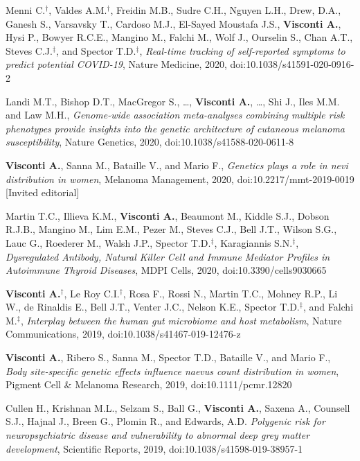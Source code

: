 {\begin{itemize}
		 Menni C.$^{\textbf{$\dag $}}$, Valdes A.M.$^{\textbf{$\dag $}}$, Freidin M.B., Sudre C.H., Nguyen L.H., Drew, D.A., Ganesh S., Varsavsky T., Cardoso M.J., El-Sayed Moustafa J.S., \textbf{Visconti A.}, Hysi P., Bowyer R.C.E., Mangino M., Falchi M., Wolf J., Ourselin S., Chan A.T., Steves C.J.$^{\textbf{$\ddag $}}$, and Spector T.D.$^{\textbf{$\ddag $}}$, \emph{Real-time tracking of self-reported symptoms to predict potential COVID-19}, Nature Medicine, 2020, doi:10.1038/s41591-020-0916-2

		 Landi M.T., Bishop D.T., MacGregor S., \dots, \textbf{Visconti A.}, \dots, Shi J., Iles M.M. and Law M.H., \emph{Genome-wide association meta-analyses combining multiple risk phenotypes provide insights into the genetic architecture of cutaneous melanoma susceptibility}, Nature Genetics, 2020, doi:10.1038/s41588-020-0611-8

		 \textbf{Visconti A.}, Sanna M., Bataille V., and Mario F., \emph{Genetics plays a role in nevi distribution in women}, Melanoma Management, 2020, doi:10.2217/mmt-2019-0019 [Invited editorial]

		 Martin T.C., Illieva K.M., \textbf{Visconti A.}, Beaumont M., Kiddle S.J., Dobson R.J.B., Mangino M., Lim E.M., Pezer M., Steves C.J., Bell J.T., Wilson S.G., Lauc G., Roederer M., Walsh J.P., Spector T.D.$^{\textbf{$\ddag $}}$, Karagiannis S.N.$^{\textbf{$\ddag $}}$, \emph{Dysregulated Antibody, Natural Killer Cell and Immune Mediator Profiles in Autoimmune Thyroid Diseases}, MDPI Cells, 2020, doi:10.3390/cells9030665
		
		 \textbf{Visconti A.}$^{\textbf{$\dag $}}$, Le Roy C.I.$^{\textbf{$\dag $}}$, Rosa F., Rossi N., Martin T.C., Mohney R.P., Li W., de Rinaldis E., Bell J.T., Venter J.C., Nelson K.E., Spector T.D.$^{\textbf{$\ddag $}}$, and Falchi M.$^{\textbf{$\ddag $}}$, \emph{Interplay between the human gut microbiome and host metabolism}, Nature Communications, 2019, doi:10.1038/s41467-019-12476-z

		 \textbf{Visconti A.}, Ribero S., Sanna M., Spector T.D., Bataille V., and Mario F., \emph{Body site-specific genetic effects influence naevus count distribution in women}, Pigment Cell \& Melanoma Research, 2019, doi:10.1111/pcmr.12820
		
		 Cullen H., Krishnan M.L., Selzam S., Ball G., \textbf{Visconti A.}, Saxena A., Counsell S.J., Hajnal J., Breen G., Plomin R., and Edwards, A.D. \emph{Polygenic risk for neuropsychiatric disease and vulnerability to abnormal deep grey matter development}, Scientific Reports, 2019, doi:10.1038/s41598-019-38957-1
		

\end{itemize}}

